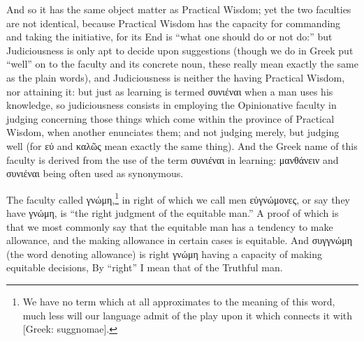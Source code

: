 And so it has the same object matter as Practical Wisdom; yet the two faculties
are not identical, because Practical Wisdom has the capacity for commanding and
taking the initiative, for its End is “what one should do or not
do:” but Judiciousness is only apt to decide upon suggestions (though we
do in Greek put “well” on to the faculty and its concrete noun,
these really mean exactly the same as the plain words), and Judiciousness is
neither the having Practical Wisdom, nor attaining it: but just as learning is
termed συνιέναι when a man uses his
knowledge, so judiciousness consists in employing the Opinionative faculty in
judging concerning those things which come within the province of Practical
Wisdom, when another enunciates them; and not judging merely, but judging well
(for εὐ and καλῶς mean exactly the same
thing). And the Greek name of this faculty is derived from the use of the term
συνιέναι in learning:
μανθάνειν and
συνιέναι being often used as
synonymous.

The faculty called γνώμη,\footnote{We have no term which at all approximates to the meaning of this word, much
less will our language admit of the play upon it which connects it with [Greek:
suggnomae].}
in right of which we call men
εὐγνώμονες, or say they
have γνώμη, is “the right judgment of the
equitable man.” A proof of which is that we most commonly say that the
equitable man has a tendency to make allowance, and the making allowance in
certain cases is equitable. And
συγγνώμη (the word denoting allowance)
is right γνώμη having a capacity of making equitable
decisions, By “right” I mean that of the Truthful man.


